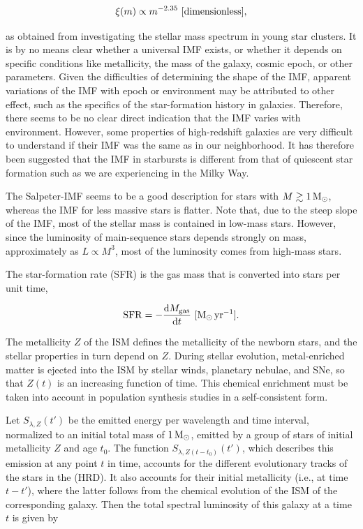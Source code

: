 \documentclass[a4paper,11pt]{article}
\begin{document}
\begin{align*}
    \xi(m) \propto m^{-2.35} ~ [{\rm dimensionless}],
\end{align*}

{\noindent}as obtained from investigating the stellar mass spectrum in young star clusters. It is by no means clear whether a universal IMF exists, or whether it depends on specific conditions like metallicity, the mass of the galaxy, cosmic epoch, or other parameters. Given the difficulties of determining the shape of the IMF, apparent variations of the IMF with epoch or environment may be attributed to other effect, such as the specifics of the star-formation history in galaxies. Therefore, there seems to be no clear direct indication that the IMF varies with environment. However, some properties of high-redshift galaxies are very difficult to understand if their IMF was the same as in our neighborhood. It has therefore been suggested that the IMF in starbursts is different from that of quiescent star formation such as we are experiencing in the Milky Way.

{\noindent}The Salpeter-IMF seems to be a good description for stars with $M\gtrsim1\,{\rm M_\odot}$, whereas the IMF for less massive stars is flatter. Note that, due to the steep slope of the IMF, most of the stellar mass is contained in low-mass stars. However, since the luminosity of main-sequence stars depends strongly on mass, approximately as $L\propto M^3$, most of the luminosity comes from high-mass stars.

{\noindent}The star-formation rate (SFR) is the gas mass that is converted into stars per unit time,

\begin{align*}
    \mathrm{SFR} = -\frac{\mathrm{d}M_\mathrm{gas}}{\mathrm{d}t} ~ [{\rm M_\odot\,yr^{-1}}].
\end{align*}

{\noindent}The metallicity $Z$ of the ISM defines the metallicity of the newborn stars, and the stellar properties in turn depend on $Z$. During stellar evolution, metal-enriched matter is ejected into the ISM by stellar winds, planetary nebulae, and SNe, so that $Z(t)$ is an increasing function of time. This chemical enrichment must be taken into account in population synthesis studies in a self-consistent form.

{\noindent}Let $S_{\lambda,Z}(t')$ be the emitted energy per wavelength and time interval, normalized to an initial total mass of $1\,{\rm M_\odot}$, emitted by a group of stars of initial metallicity $Z$ and age $t_0$. The function $S_{\lambda,Z(t-t_0)}(t')$, which describes this emission at any point $t$ in time, accounts for the different evolutionary tracks of the stars in the (HRD). It also accounts for their initial metallicity (i.e., at time $t-t'$), where the latter follows from the chemical evolution of the ISM of the corresponding galaxy. Then the total spectral luminosity of this galaxy at a time $t$ is given by
\end{document}
